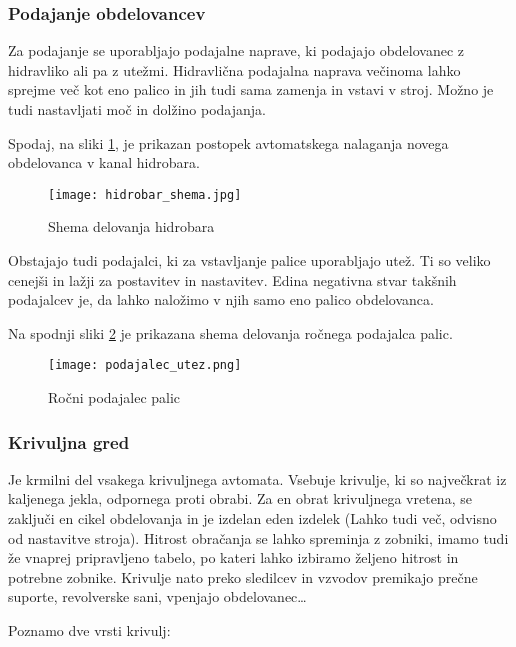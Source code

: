 \subsubsection{Podajanje obdelovancev}
Za podajanje se uporabljajo podajalne naprave, ki podajajo
obdelovanec z hidravliko ali pa z utežmi. Hidravlična podajalna
naprava večinoma lahko sprejme več kot eno palico in jih tudi sama
zamenja in vstavi v stroj. Možno je tudi nastavljati moč in dolžino
podajanja.

Spodaj, na sliki \ref{hidrobar_nalaganje}, je prikazan postopek
avtomatskega nalaganja novega obdelovanca v kanal hidrobara.
\begin{figure}[H]
	\begin{center}
		\texttt{[image: hidrobar\_shema.jpg]}
		\caption{Shema delovanja hidrobara
			\cite{interna}}
		\label{hidrobar_nalaganje}
	\end{center}
\end{figure}

Obstajajo tudi podajalci, ki za vstavljanje palice uporabljajo
utež. Ti so veliko cenejši in lažji za postavitev in nastavitev.
Edina negativna stvar takšnih podajalcev je, da lahko naložimo v
njih samo eno palico obdelovanca.

Na spodnji sliki \ref{shema_rocnega_podajalca} je prikazana shema
delovanja ročnega podajalca palic.

\begin{figure}[H]
	\begin{center}
		\texttt{[image: podajalec\_utez.png]}
		\caption{Ročni podajalec palic
			\cite{interna}}
		\label{shema_rocnega_podajalca}
	\end{center}
\end{figure}

\subsubsection{Krivuljna gred}
Je krmilni del vsakega krivuljnega avtomata. Vsebuje krivulje,
ki so največkrat iz kaljenega jekla, odpornega proti obrabi. Za en
obrat krivuljnega vretena, se zaključi en cikel obdelovanja in je
izdelan eden izdelek (Lahko tudi več, odvisno od nastavitve stroja).
Hitrost obračanja se lahko spreminja z
zobniki, imamo tudi že vnaprej pripravljeno tabelo, po kateri
lahko izbiramo željeno hitrost in potrebne zobnike. Krivulje nato
preko sledilcev in vzvodov premikajo prečne suporte,
revolverske sani, vpenjajo obdelovanec…

\noindent Poznamo dve vrsti krivulj:

